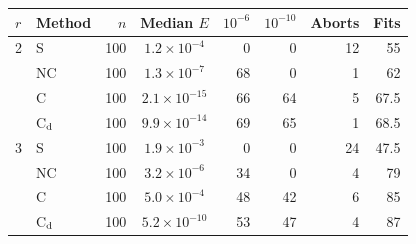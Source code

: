 \begin{tabular}{@{}llr crrr r@{}}
\toprule
$r$ & Method & $n$ & Median $E$ & $10^{-6}$ & $10^{-10}$ & Aborts & Fits\\
\midrule
2 & S & 100 & $1.2\times10^{-4}$ & 0 & 0 & 12 & 55\\
 & NC & 100 & $1.3\times10^{-7}$ & 68 & 0 & 1 & 62\\
 & C & 100 & $2.1\times10^{-15}$ & 66 & 64 & 5 & 67.5\\
 & C$_{\rm d}$ & 100 & $9.9\times10^{-14}$ & 69 & 65 & 1 & 68.5\\
\midrule
3 & S & 100 & $1.9\times10^{-3}$ & 0 & 0 & 24 & 47.5\\
 & NC & 100 & $3.2\times10^{-6}$ & 34 & 0 & 4 & 79\\
 & C & 100 & $5.0\times10^{-4}$ & 48 & 42 & 6 & 85\\
 & C$_{\rm d}$ & 100 & $5.2\times10^{-10}$ & 53 & 47 & 4 & 87\\
\bottomrule
\end{tabular}

